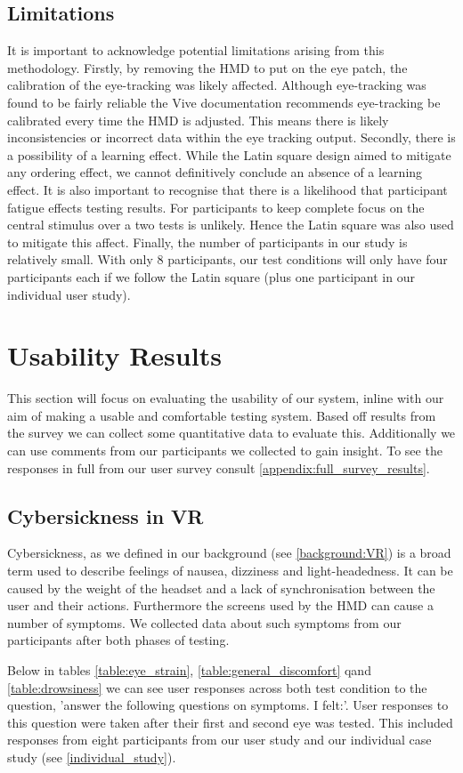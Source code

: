 \documentclass{l4proj}
\begin{document}
\subsection{Limitations}
It is important to acknowledge potential limitations arising from this methodology. Firstly, by removing the HMD to put on the eye patch, the calibration of the eye-tracking was likely affected. Although eye-tracking was found to be fairly reliable the Vive documentation recommends eye-tracking be calibrated every time the HMD is adjusted. This means there is likely inconsistencies or incorrect data within the eye tracking output. Secondly, there is a possibility of a learning effect. While the Latin square design aimed to mitigate any ordering effect, we cannot definitively conclude an absence of a learning effect. It is also important to recognise that there is a likelihood that participant fatigue effects testing results. For participants to keep complete focus on the central stimulus over a two tests is unlikely. Hence the Latin square was also used to mitigate this affect. Finally, the number of participants in our study is relatively small. With only 8 participants, our test conditions will only have four participants each if we follow the Latin square (plus one participant in our individual user study). 
\section{Usability Results}
This section will focus on evaluating the usability of our system, inline with our aim of making a usable and comfortable testing system. Based off results from the survey we can collect some quantitative data to evaluate this. Additionally we can use comments from our participants we collected to gain insight. To see the responses in full from our user survey consult \ref{appendix:full_survey_results}.
\subsection{Cybersickness in VR}
Cybersickness, as we defined in our background (see \ref{background:VR}) is a broad term used to describe feelings of nausea, dizziness and light-headedness. It can be caused by the weight of the headset and a lack of synchronisation between the user and their actions. Furthermore the screens used by the HMD can cause a number of symptoms. We collected data about such symptoms from our participants after both phases of testing.

Below in tables \ref{table:eye_strain}, \ref{table:general_discomfort} qand \ref{table:drowsiness} we can see user responses across both test condition to the question, 'answer the following questions on symptoms. I felt:'. User responses to this question were taken after their first and second eye was tested. This included responses from eight participants from our user study and our individual case study (see \ref{individual_study}).
\end{document}
